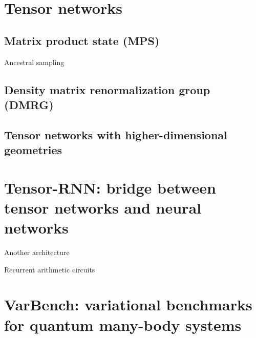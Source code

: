 \chapter{Tensor networks}
\label{ch:tn}

\section{Matrix product state (MPS)}

Ancestral sampling~\cite{wei2022sequential}

\section{Density matrix renormalization group (DMRG)}

\section{Tensor networks with higher-dimensional geometries}

\chapter{Tensor-RNN: bridge between tensor networks and neural networks}

Another architecture~\cite{hibat2021variational, hibat2022supplementing}

Recurrent arithmetic circuits~\cite{levine2017long, levine2019quantum}

\chapter{VarBench: variational benchmarks for quantum many-body systems}
\label{ch:varbench}
